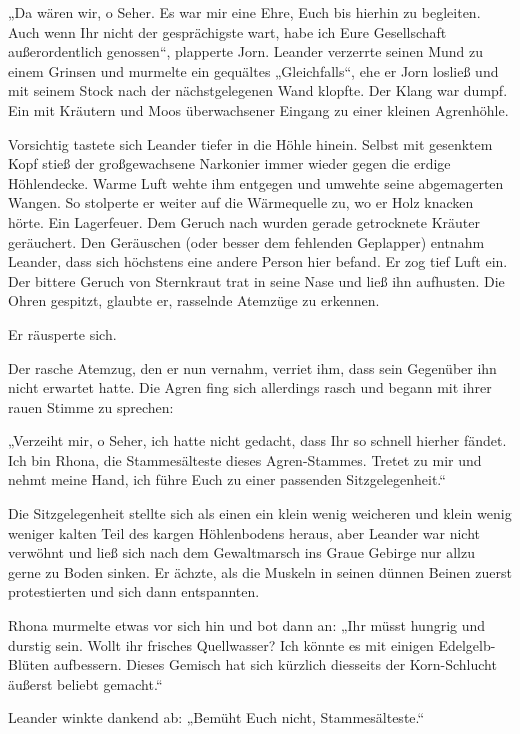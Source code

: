 \trennzeichen



„Da wären wir, o Seher. Es war mir eine Ehre, Euch bis hierhin zu begleiten. Auch wenn Ihr nicht der gesprächigste wart, habe ich Eure Gesellschaft außerordentlich genossen“, plapperte Jorn. Leander verzerrte seinen Mund zu einem Grinsen und murmelte ein gequältes „Gleichfalls“, ehe er Jorn losließ und mit seinem Stock nach der nächstgelegenen Wand klopfte. Der Klang war dumpf. Ein mit Kräutern und Moos überwachsener Eingang zu einer kleinen Agrenhöhle.

Vorsichtig tastete sich Leander tiefer in die Höhle hinein. Selbst mit gesenktem Kopf stieß der großgewachsene Narkonier immer wieder gegen die erdige Höhlendecke. Warme Luft wehte ihm entgegen und umwehte seine abgemagerten Wangen. So stolperte er weiter auf die Wärmequelle zu, wo er Holz knacken hörte. Ein Lagerfeuer. Dem Geruch nach wurden gerade getrocknete Kräuter geräuchert. Den Geräuschen (oder besser dem fehlenden Geplapper) entnahm Leander, dass sich höchstens eine andere Person hier befand. Er zog tief Luft ein. Der bittere Geruch von Sternkraut trat in seine Nase und ließ ihn aufhusten. Die Ohren gespitzt, glaubte er, rasselnde Atemzüge zu erkennen.

Er räusperte sich.

Der rasche Atemzug, den er nun vernahm, verriet ihm, dass sein Gegenüber ihn nicht erwartet hatte. Die Agren fing sich allerdings rasch und begann mit ihrer rauen Stimme zu sprechen:

„Verzeiht mir, o Seher, ich hatte nicht gedacht, dass Ihr so schnell hierher fändet. Ich bin Rhona, die Stammesälteste dieses Agren-Stammes. Tretet zu mir und nehmt meine Hand, ich führe Euch zu einer passenden Sitzgelegenheit.“

Die Sitzgelegenheit stellte sich als einen ein klein wenig weicheren und klein wenig weniger kalten Teil des kargen Höhlenbodens heraus, aber Leander war nicht verwöhnt und ließ sich nach dem Gewaltmarsch ins Graue Gebirge nur allzu gerne zu Boden sinken. Er ächzte, als die Muskeln in seinen dünnen Beinen zuerst protestierten und sich dann entspannten.

Rhona murmelte etwas vor sich hin und bot dann an: „Ihr müsst hungrig und durstig sein. Wollt ihr frisches Quellwasser? Ich könnte es mit einigen Edelgelb-Blüten aufbessern. Dieses Gemisch hat sich kürzlich diesseits der Korn-Schlucht äußerst beliebt gemacht.“

Leander winkte dankend ab: „Bemüht Euch nicht, Stammesälteste.“

